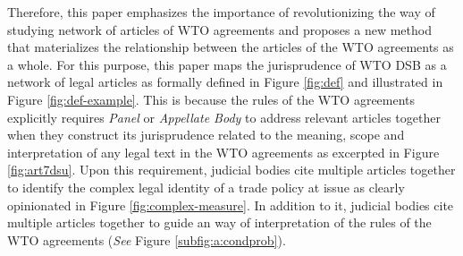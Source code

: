  
 
 
 
Therefore, this paper emphasizes the importance of revolutionizing the way of studying network of articles of WTO agreements and proposes a new method that
materializes the relationship between the articles of the WTO agreements as a whole.
For this purpose, this paper maps
the jurisprudence of WTO DSB
as a network of legal articles
as formally defined in Figure \ref{fig:def} and illustrated in Figure \ref{fig:def-example}. This is because the rules of the WTO agreements
explicitly requires \textit{Panel} or \textit{Appellate Body} to address
relevant articles together when they construct its jurisprudence related to the meaning, scope and interpretation of any legal text in the WTO agreements as excerpted in Figure \ref{fig:art7dsu}.
Upon this requirement, judicial bodies cite
multiple articles together
to identify the complex legal identity of a trade policy at issue as clearly opinionated in Figure \ref{fig:complex-measure}.
In addition to it, judicial bodies cite multiple articles together
to guide an way of interpretation of the rules of the WTO agreements (\textit{See} Figure \ref{subfig:a:condprob}).
 
 
 
